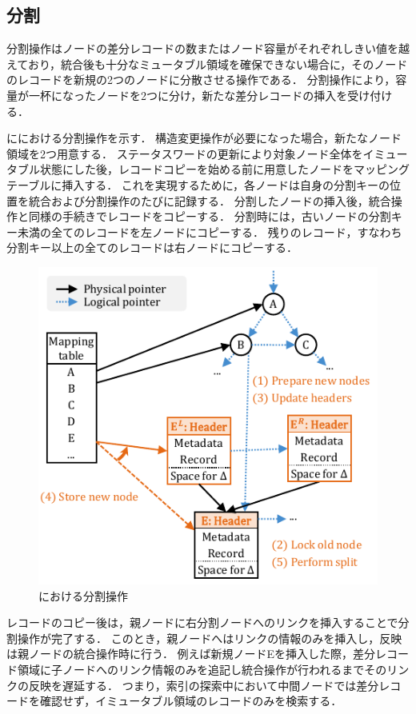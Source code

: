 \subsection{分割}
分割操作はノードの差分レコードの数またはノード容量がそれぞれしきい値を越えており，統合後も十分なミュータブル領域を確保できない場合に，そのノードのレコードを新規の2つのノードに分散させる操作である．
分割操作により，容量が一杯になったノードを2つに分け，新たな差分レコードの挿入を受け付ける．

\Fig{\ref{fig:bc_tree_split}}に\Bcforest{}における分割操作を示す．
構造変更操作が必要になった場合，新たなノード領域を2つ用意する．
ステータスワードの更新により対象ノード全体をイミュータブル状態にした後，レコードコピーを始める前に用意したノードをマッピングテーブルに挿入する．
これを実現するために，各ノードは自身の分割キーの位置を統合および分割操作のたびに記録する．
分割したノードの挿入後，統合操作と同様の手続きでレコードをコピーする．
分割時には，古いノードの分割キー未満の全てのレコードを左ノードにコピーする．
残りのレコード，すなわち分割キー以上の全てのレコードは右ノードにコピーする．

\begin{figure}[t]
    \centering
    \includegraphics{./figures/Bc-split.pdf}
    \caption{\Bcforest{}における分割操作}
    \label{fig:bc_tree_split}
\end{figure}

レコードのコピー後は，親ノードに右分割ノードへのリンクを挿入することで分割操作が完了する．
このとき，親ノードへはリンクの情報のみを挿入し，反映は親ノードの統合操作時に行う．
例えば新規ノードEを挿入した際，差分レコード領域に子ノードへのリンク情報のみを追記し統合操作が行われるまでそのリンクの反映を遅延する．
つまり，索引の探索中において中間ノードでは差分レコードを確認せず，イミュータブル領域のレコードのみを検索する．

